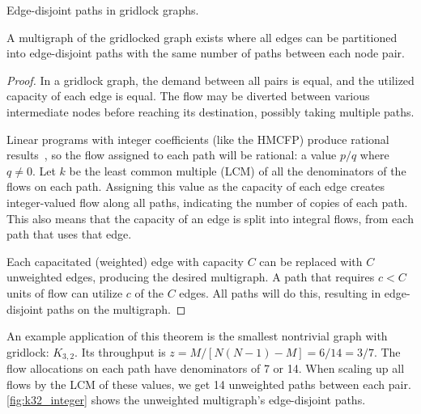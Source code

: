 \begin{theorem}{Edge-disjoint paths in gridlock graphs.} \label{thm:edge}


A multigraph of the gridlocked graph exists where all edges can be partitioned into edge-disjoint paths with the same number of paths between each node pair.
\end{theorem}
\begin{proof}
In a gridlock graph, the demand between all pairs is equal, and the utilized capacity of each edge is equal. The flow may be diverted between various intermediate nodes before reaching its destination, possibly taking multiple paths.

Linear programs with integer coefficients (like the HMCFP) produce rational results~\cite{adler1992polynomial}, so the flow assigned to each path will be rational: a value $p/q$ where $q \ne 0$. Let $k$ be the least common multiple (LCM) of all the denominators of the flows on each path. Assigning this value as the capacity of each edge creates integer-valued flow along all paths, indicating the number of copies of each path. This also means that the capacity of an edge is split into integral flows, from each path that uses that edge.

Each capacitated (weighted) edge with capacity $C$ can be replaced with $C$ unweighted edges, producing the desired multigraph. A path that requires $c < C$ units of flow can utilize $c$ of the $C$ edges. All paths will do this, resulting in edge-disjoint paths on the multigraph. 
\end{proof}

An example application of this theorem is the smallest nontrivial graph with gridlock: $K_{3,2}$. Its throughput is $z = M/[N (N -1) - M] = 6/14 = 3/7$. The flow allocations on each path have denominators of 7 or 14. When scaling up all flows by the LCM of these values, we get 14 unweighted paths between each pair. \autoref{fig:k32_integer} shows the unweighted multigraph's edge-disjoint paths.

